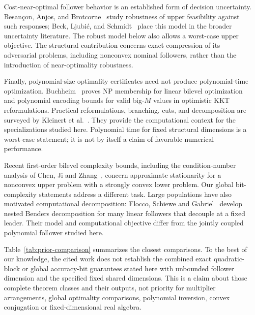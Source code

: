 Cost-near-optimal follower behavior is an established form of decision
uncertainty. Besan\c{c}on, Anjos, and Brotcorne~\cite{BesanconAnjosBrotcorne2024}
study robustness of upper feasibility against such responses;
Beck, Ljubi\'c, and Schmidt~\cite{BeckLjubicSchmidt2023} place this model in
the broader uncertainty literature. The robust model below also allows a
worst-case upper objective. The structural contribution concerns exact
compression of its adversarial problems, including nonconvex nominal
followers, rather than the introduction of near-optimality robustness.

Finally, polynomial-size optimality certificates need not produce
polynomial-time optimization. Buchheim~\cite{Buchheim2023} proves NP
membership for linear bilevel optimization and polynomial encoding bounds
for valid big-$M$ values in optimistic KKT reformulations. Practical
reformulations, branching, cuts, and decomposition are surveyed by
Kleinert et al.~\cite{KleinertEtAl2021}. They provide the computational
context for the specializations studied here. Polynomial time for fixed
structural dimensions is a worst-case statement; it is not by itself a
claim of favorable numerical performance.

Recent first-order bilevel complexity bounds, including the condition-number
analysis of Chen, Ji and Zhang~\cite{ChenJiZhang2026}, concern approximate
stationarity for a nonconvex upper problem with a strongly convex lower
problem. Our global bit-complexity statements address a different task.
Large populations have also motivated computational decomposition: Flocco,
Schiewe and Gabriel~\cite{FloccoEtAl2026} develop nested Benders decomposition
for many linear followers that decouple at a fixed leader. Their model and
computational objective differ from the jointly coupled polynomial follower
studied here.

Table~\ref{tab:prior-comparison} summarizes the closest comparisons.
To the best of our knowledge, the cited work does not establish the combined
exact quadratic-block or global accuracy-bit guarantees stated here with
unbounded follower dimension and the specified fixed shared dimensions.
This is a claim about those complete theorem classes and their outputs,
not priority for multiplier arrangements, global optimality comparisons,
polynomial inversion, convex conjugation or fixed-dimensional real algebra.

